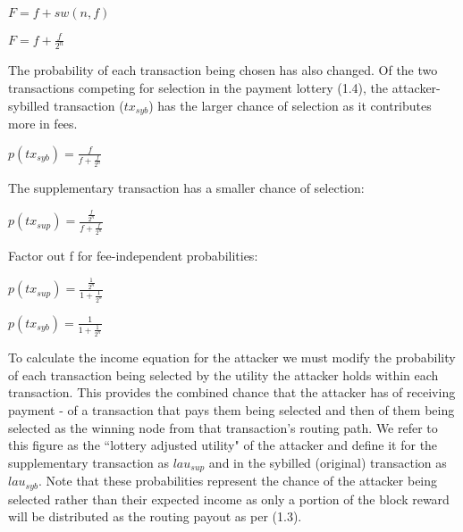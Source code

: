 \documentclass[oneside]{article}   	%
\begin{document}
\begin{multicols}{2}
\large
\begin{adjustwidth}{1.5em}{1.5em} 
	\begin{math}
F = f + sw(n, f)
	\end{math}

	\begin{math}
F = f + \frac{f}{2^{n}}
	\end{math}
\end{adjustwidth}
\normalsize

The probability of each transaction being chosen has also changed. Of the two transactions competing for selection in the payment lottery (1.4), the attacker-sybilled transaction (\begin{math}tx_{syb}\end{math}) has the larger chance of selection as it contributes more in fees.

\large
\begin{adjustwidth}{1.5em}{1.5em} 
	\begin{math}
p(tx_{syb}) = \frac{f}{f + \frac{f}{2^n}}
	\end{math}
\end{adjustwidth}
\normalsize

The supplementary transaction has a smaller chance of selection:

\large
\begin{adjustwidth}{1.5em}{1.5em} 
	\begin{math}
p(tx_{sup}) = \frac{\frac{f}{2^n}}{f + \frac{f}{2^n}}
	\end{math}
\end{adjustwidth}
\normalsize

Factor out f for fee-independent probabilities:

\large
\begin{adjustwidth}{1.5em}{1.5em} 
	\begin{math}
p(tx_{sup}) = \frac{\frac{1}{2^n}}{1 + \frac{1}{2^n}}
	\end{math}

	\begin{math}
p(tx_{syb}) = \frac{1}{1 + \frac{1}{2^n}}
	\end{math}
\end{adjustwidth}
\normalsize

To calculate the income equation for the attacker we must modify the probability of each transaction being selected by the utility the attacker holds within each transaction. This provides the combined chance that the attacker has of receiving payment - of a transaction that pays them being selected and then of them being selected as the winning node from that transaction's routing path. We refer to this figure as the ``lottery adjusted utility" of the attacker and define it for the supplementary transaction as \begin{math}lau_{sup}\end{math} and in the sybilled (original) transaction as \begin{math}lau_{syb}\end{math}. Note that these probabilities represent the chance of the attacker being selected rather than their expected income as only a portion of the block reward will be distributed as the routing payout as per (1.3).


\end{multicols}
\end{document}
